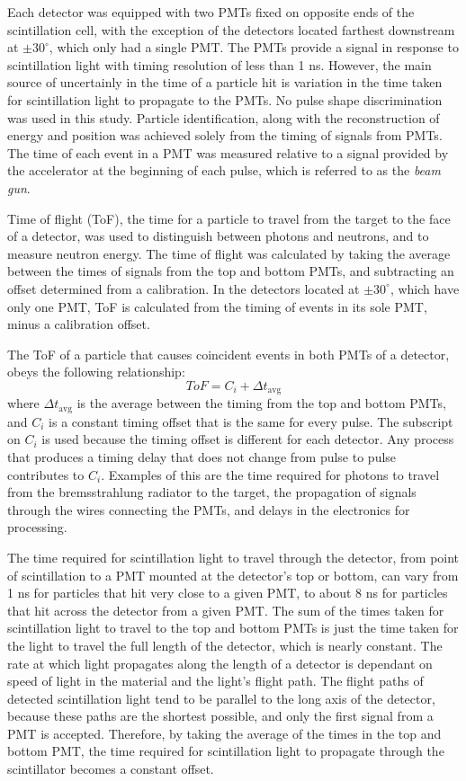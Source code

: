 Each detector was equipped with two PMTs fixed on opposite ends of the scintillation cell, with the exception of the detectors located farthest downstream at $\pm30^{\circ}$, which only had a single PMT.
The PMTs provide a signal in response to scintillation light with timing resolution of less than 1 ns.
However, the main source of uncertainly in the time of a particle hit is variation in the time taken for scintillation light to propagate to the PMTs. No pulse shape discrimination was used in this study.
Particle identification, along with the reconstruction of energy and position was achieved solely from the timing of signals from PMTs.
The time of each event in a PMT was measured relative to a signal provided by the accelerator at the beginning of each pulse, which is referred to as the \textit{beam gun}.

Time of flight (ToF), the time for a particle to travel from the target to the face of a detector, was used to distinguish between photons and neutrons, and to measure neutron energy.
The time of flight was calculated by taking the average between the times of signals from the top and bottom PMTs, and subtracting an offset determined from a calibration.
In the detectors located at $\pm30^{\circ}$, which have only one PMT, ToF is calculated from the timing of events in its sole PMT, minus a calibration offset.

The ToF of a particle that causes coincident events in both PMTs of a detector, obeys the following relationship:
\begin{displaymath}
ToF = C_i + \Delta t_{\text{avg}} 
\end{displaymath}
where $\Delta t_{\text{avg}} $ is the average between the timing from the top and bottom PMTs, and $C_i$ is a constant timing offset that is the same for every pulse.
The subscript on $C_i$ is used because the timing offset is different for each detector.
Any process that produces a timing delay that does not change from pulse to pulse contributes to $C_{i}$.
Examples of this are the time required for photons to travel from the bremsstrahlung radiator to the target, the propagation of signals through the wires connecting the PMTs, and delays in the electronics for processing.

The time required for scintillation light to travel through the detector, from point of scintillation to a PMT mounted at the detector's top or bottom, can vary from 1 ns for particles that hit very close to a given PMT, to about 8 ns for particles that hit across the detector from a given PMT. The sum of the times taken for scintillation light to travel to the top and bottom PMTs is just the time taken for the light to travel the full length of the detector, which is nearly constant.
The rate at which light propagates along the length of a detector is dependant on speed of light in the material and the light's flight path.
The flight paths of detected scintillation light tend to be parallel to the long axis of the detector, because these paths are the shortest possible, and only the first signal from a PMT is accepted.
Therefore, by taking the average of the times in the top and bottom PMT, the time required for scintillation light to propagate through the scintillator becomes a constant offset.

